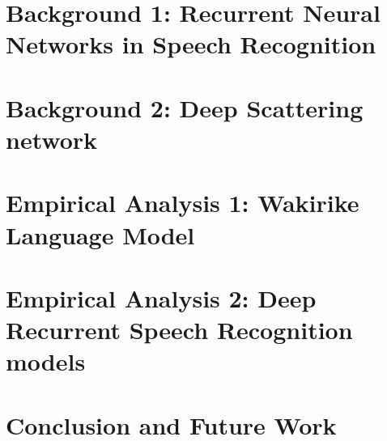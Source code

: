 \documentclass[12pt,twoside]{report}
\begin{document}
\chapter{Background 1: Recurrent Neural Networks in Speech Recognition}\label{ch3RNN}


\chapter{Background 2: Deep Scattering network}\label{ch4DSN}


\chapter{Empirical Analysis 1: Wakirike Language Model}\label{ch6_wlm}


\chapter{Empirical Analysis 2: Deep Recurrent Speech Recognition models}\label{ch6_speech}


\chapter{Conclusion and Future Work}\label{ch8_future}

\chapter*{\appendix}
\label{app_haar}
\chapter*{\appendix}

\chapter*{\appendix}

\chapter*{\appendix}
\label{app4_tfcode}

\startblue

\stopblue
\end{document}

